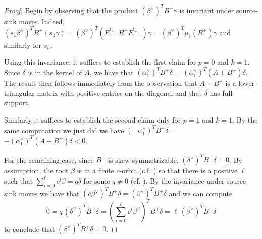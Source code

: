 \documentclass{amsart}
\numberwithin{theorem}{section}
\begin{document}
  \begin{proof}
    Begin by observing that the product $(\beta^\vee)^T B^+ \gamma$ is invariant under source-sink moves.
    Indeed, $(s_1\beta^\vee)^T B^+ (s_1\gamma) = (\beta^\vee)^T (E^{t_+}_{1,-} B^+ F^{t_+}_{1,-}) \gamma = (\beta^\vee)^T \mu_1(B^+) \gamma$ and similarly for $s_n$.

    Using this invariance, it suffices to establish the first claim for $p=0$ and $k=1$.
    Since $\delta$ is in the kernel of $A$, we have that $(\alpha_1^\vee)^T B^+ \delta$ = $(\alpha_1^\vee)^T (A+B^+) \delta$.
    The result then follows immediately from the observation that $A + B^+$ is a lower-triangular matrix with positive entries on the diagonal and that $\delta$ has full support.

    Similarly it suffices to establish the second claim only for $p=1$ and $k=1$.
    By the same computation we just did we have $(-\alpha_1^\vee)^T B^+ \delta$ = $-(\alpha_1^\vee)^T (A+B^+) \delta <0$.

    For the remaining case, since $B^+$ is skew-symmetrizable, $(\delta^\vee)^T B^+ \delta = 0$.
    By assumption, the root $\beta$ is in a finite $c$-orbit (c.f. \cite[Proposition 1.9 and Section 1, final Remark]{Dlab-Ringel}) so that there is a positive $\ell$ such that $\sum_{i=0}^\ell c^i \beta = q \delta$ for some $q\neq 0$ (cf. \cite{afforb}).
    By the invariance under source-sink moves we have that $(c\beta^\vee)^T B^+ \delta = (\beta^\vee)^T B^+ \delta$ and we can compute
    \[
      0 = q\, (\delta^\vee)^T B^+ \delta = \left(\sum_{i=0}^\ell c^i \beta^\vee\right)^T B^+ \delta = \ell\, (\beta^\vee)^T B^+ \delta
    \]
  to conclude that $(\beta^\vee)^T B^+ \delta = 0$.
  \end{proof}
\end{document}
